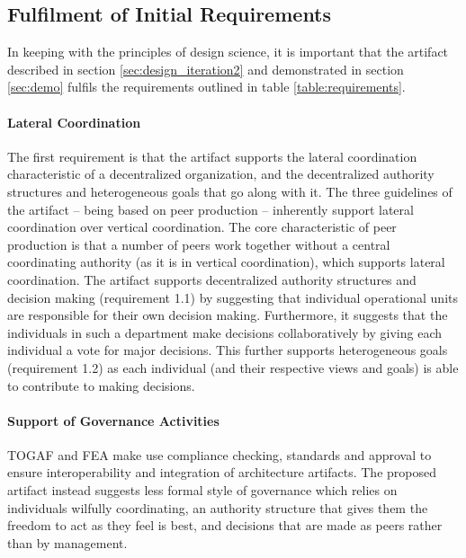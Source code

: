 \subsection{Fulfilment of Initial Requirements}

In keeping with the principles of design science, it is important that the artifact described in section \ref{sec:design_iteration2} and demonstrated in section \ref{sec:demo} fulfils the requirements outlined in table \ref{table:requirements}. 

\paragraph{Lateral Coordination}

The first requirement is that the artifact supports the lateral coordination characteristic of a decentralized organization, and the decentralized authority structures and heterogeneous goals that go along with it. The three guidelines of the artifact -- being based on peer production -- inherently support lateral coordination over vertical coordination. The core characteristic of peer production is that a number of peers work together without a central coordinating authority (as it is in vertical coordination), which supports lateral coordination. The artifact supports decentralized authority structures and decision making (requirement 1.1) by suggesting that individual operational units are responsible for their own decision making. Furthermore, it suggests that the individuals in such a department make decisions collaboratively by giving each individual a vote for major decisions. This further supports heterogeneous goals (requirement 1.2) as each individual (and their respective views and goals) is able to contribute to making decisions.

\paragraph{Support of Governance Activities}

TOGAF and FEA make use compliance checking, standards and approval to ensure interoperability and integration of architecture artifacts. The proposed artifact instead suggests less formal style of governance which relies on individuals wilfully coordinating, an authority structure that gives them the freedom to act as they feel is best, and decisions that are made as peers rather than by management.

